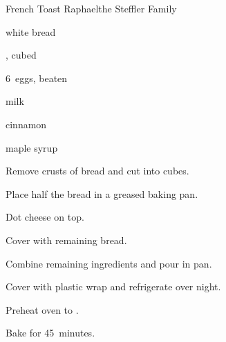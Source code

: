 \begin{recipe}{French Toast Raphael}{the Steffler Family}{}

\begin{ingredients}
\item {} white bread
\item {} , cubed
\item 6~eggs, beaten
\item {} milk
\item \tp{\half} cinnamon
\item \C{\third} maple syrup
\end{ingredients}

\begin{directions}
\item Remove crusts of bread and cut into  cubes.
\item Place half the bread in a greased  baking pan.
\item Dot cheese on top.
\item Cover with remaining bread.
\item Combine remaining ingredients and pour in pan.
\item Cover with plastic wrap and refrigerate over night.
\item Preheat oven to .
\item Bake for 45~minutes.
\end{directions}
\end{recipe}
